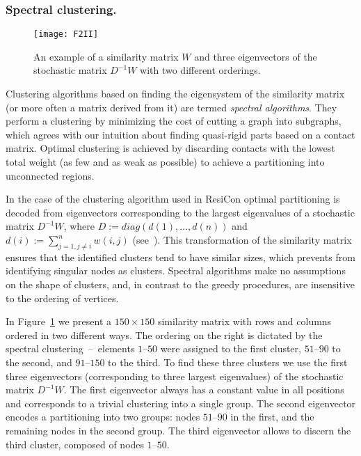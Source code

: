 \subsubsection*{Spectral clustering.}
\begin{figure}
\centering
\texttt{[image: F2II]}
\caption{
An example of a similarity matrix $W$ and three eigenvectors of the stochastic matrix $D^{-1}W$ with two different orderings.
}
\label{clustering}
\end{figure}

Clustering algorithms based on finding the eigensystem of the similarity matrix (or more often a matrix derived from it) are termed \emph{spectral algorithms}.
They perform a clustering by minimizing the cost of cutting a graph into subgraphs, which agrees with our intuition about finding quasi-rigid parts based on a contact matrix.
Optimal clustering is achieved by discarding contacts with the lowest total weight (as few and as weak as possible) to achieve a partitioning into unconnected regions.

In the case of the clustering algorithm used in ResiCon optimal partitioning is decoded from eigenvectors corresponding to the largest eigenvalues of a stochastic matrix $D^{-1}W$, where $D:=diag(d(1),\ldots,d(n))$ and $d(i):=\sum_{j=1,j\neq i}^{n} w(i,j)$ (see~\cite{weber2004perron}).
This transformation of the similarity matrix ensures that the identified clusters tend to have similar sizes, which prevents from identifying singular nodes as clusters.
Spectral algorithms make no assumptions on the shape of clusters, and, in contrast to the greedy procedures, are insensitive to the ordering of vertices.

In Figure~\ref{clustering} we present a $150\times 150$ similarity matrix with rows and columns ordered in two different ways.
The ordering on the right is dictated by the spectral clustering~--~elements $1\text{--}50$ were assigned to the first cluster, $51\text{--}90$ to the second, and $91\text{--}150$ to the third.
To find these three clusters we use the first three eigenvectors (corresponding to three largest eigenvalues) of the stochastic matrix $D^{-1}W$.
The first eigenvector always has a constant value in all positions and corresponds to a trivial clustering into a single group.
The second eigenvector encodes a partitioning into two groups: nodes $51\text{--}90$ in the first, and the remaining nodes in the second group.
The third eigenvector allows to discern the third cluster, composed of nodes $1\text{--}50$.

